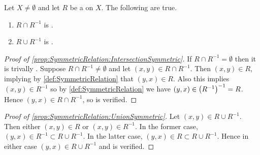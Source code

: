 \begin{prop}
    \label{prop:SymmetricRelation}
    Let $X \neq \emptyset$ 
    and let $R$ be a \Relation on $X$. 
    The following are true. 
    \begin{enumerate}[label=(\roman*), ref={\ref{prop:SymmetricRelation}~\roman*}]
    \item \label{prop:SymmetricRelation:IntersectionSymmetric} $R \cap R^{-1}$ is \SymmetricRelation.
    \item \label{prop:SymmetricRelation:UnionSymmetric}$R \cup R^{-1}$ is \SymmetricRelation.
    \end{enumerate}
    \begin{proof}[Proof of \ref{prop:SymmetricRelation:IntersectionSymmetric}]
    If $R \cap R^{-1} = \emptyset$ then it is trivally \SymmetricRelation.
    Suppose $R \cap R^{-1} \neq \emptyset$ and let $(x,y) \in R \cap R^{-1}$. 
    Then $(x,y) \in R$, implying by \ref{def:SymmetricRelation} that $(y,x) \in R$. 
    Also this implies $(x,y) \in R^{-1}$ so by \ref{def:SymmetricRelation} we have 
    $(y,x) \in \left( R^{-1}\right)^{-1}=R$. Hence $(y,x) \in R \cap R^{-1}$, so \RelationSymmetry is 
    verified.
    \end{proof}
    \begin{proof}[Proof of \ref{prop:SymmetricRelation:UnionSymmetric}]
    Let $(x,y) \in R \cup R^{-1}$. Then either $(x,y) \in R$ 
    or $(x,y) \in R^{-1}$. 
    In the former case, $(y,x) \in R^{-1} \subset R \cup R^{-1}$. 
    In the latter case, $(y,x) \in R \subset R \cup R^{-1}$. 
    Hence in either case $(y, x) \in R \cup R^{-1}$ and \RelationSymmetry is verified.
    \end{proof}
\end{prop}
